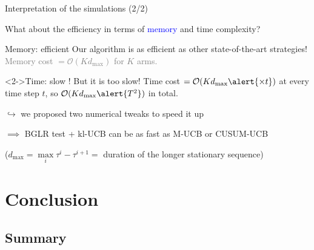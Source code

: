 \documentclass[11pt,french,ignorenonframetext,]{beamer}
\begin{document}
\begin{frame}{Interpretation of the simulations (2/2)}

  What about the efficiency in terms of \textcolor{blue}{memory} and \alert{time} complexity?

  \begin{block}{Memory: efficient \dSmiley}
    Our algorithm is as efficient as other state-of-the-art strategies!\\
    \textcolor{gray}{Memory cost $= \mathcal{O}(K d_{\max})$ for $K$ arms.}
  \end{block}

  \begin{alertblock}<2->{Time: slow \dSadey{} !}
    But it is too slow!
    Time cost $= \mathcal{O}(K d_{\max} \alert{\times t})$
    at every time step $t$,
    so $\mathcal{O}(K d_{\max} \alert{T^2})$ in total.

    $\hookrightarrow$ we proposed two numerical tweaks to speed it up

    $\implies$ BGLR test + kl-UCB can be as fast as M-UCB or CUSUM-UCB

  \end{alertblock}

  \begin{small}
    ($d_{\max} = \max\limits_i \tau^i - \tau^{i+1} =$ duration of the longer stationary sequence)
  \end{small}

\end{frame}



\section{\hfill{}Conclusion\hfill{}}
\subsection{Summary}
\end{document}
